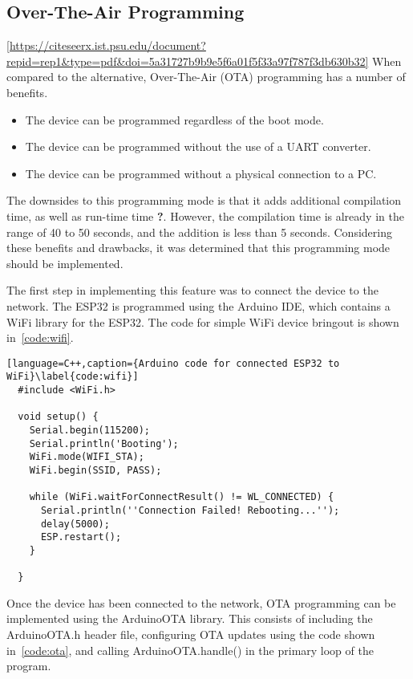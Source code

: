 \subsection{Over-The-Air Programming}
\ref{https://citeseerx.ist.psu.edu/document?repid=rep1&type=pdf&doi=5a31727b9b9e5f6a01f5f33a97f787f3db630b32}
When compared to the alternative, Over-The-Air (OTA) programming has a number of benefits.

\begin{itemize}
        \item The device can be programmed regardless of the boot mode.
        \item The device can be programmed without the use of a UART converter.
        \item The device can be programmed without a physical connection to a PC.
\end{itemize}

The downsides to this programming mode is that it adds additional compilation time, as well as run-time time \textbf{?}.
However, the compilation time is already in the range of 40 to 50 seconds, and the addition is less than 5 seconds.
Considering these benefits and drawbacks, it was determined that this programming mode should be implemented.

The first step in implementing this feature was to connect the device to the network.
The ESP32 is programmed using the Arduino IDE, which contains a WiFi library for the ESP32.
The code for simple WiFi device bringout is shown in~\autoref{code:wifi}.

\begin{lstlisting}[language=C++,caption={Arduino code for connected ESP32 to WiFi}\label{code:wifi}]
  #include <WiFi.h>

  void setup() {
    Serial.begin(115200);
    Serial.println('Booting');
    WiFi.mode(WIFI_STA);
    WiFi.begin(SSID, PASS);

    while (WiFi.waitForConnectResult() != WL_CONNECTED) {
      Serial.println(''Connection Failed! Rebooting...'');
      delay(5000);
      ESP.restart();
    }

  }
\end{lstlisting}

Once the device has been connected to the network, OTA programming can be implemented using the ArduinoOTA library.
This consists of including the ArduinoOTA.h header file,
configuring OTA updates using the code shown in~\autoref{code:ota},
and calling ArduinoOTA.handle() in the primary loop of the program.

